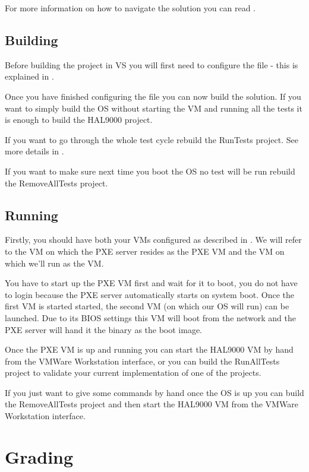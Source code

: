 For more information on how to navigate the solution you can read .

\subsection{Building \projectname}

Before building the project in VS you will first need to configure the  file - this
is explained in .

Once you have finished configuring the  file you can now build the solution. If you
want to simply build the OS without starting the VM and running all the tests it is enough to build
the HAL9000 project.

If you want to go through the whole test cycle rebuild the RunTests project. See more details in
.

If you want to make sure next time you boot the OS no test will be run rebuild the RemoveAllTests
project.

\subsection{Running \projectname}

Firstly, you should have both your VMs configured as described in . We will
refer to the VM on which the PXE server resides as the PXE VM and the VM on which we'll run
\projectname as the \projectname VM.

You have to start up the PXE VM first and wait for it to boot, you do not have to login because the
PXE server automatically starts on system boot. Once the first VM is started started, the second VM
(on which our OS will run) can be launched. Due to its BIOS settings this VM will boot from the
network and the PXE server will hand it the \projectname binary as the boot image.

Once the PXE VM is up and running you can start the HAL9000 VM by hand from the VMWare Workstation
interface, or you can build the RunAllTests project to validate your current implementation of one
of the projects.

If you just want to give some commands by hand once the OS is up you can build the RemoveAllTests
project and then start the HAL9000 VM from the VMWare Workstation interface.

\section{Grading}

